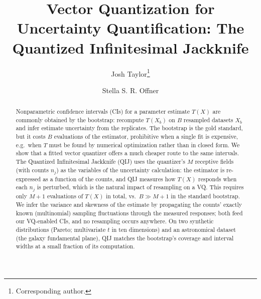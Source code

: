 \documentclass[runningheads]{llncs}
\begin{document}
\title{Vector Quantization for Uncertainty Quantification: The Quantized Infinitesimal Jackknife}

\author{Josh Taylor\thanks{Corresponding author.} \and
Stella S. R. Offner}

\maketitle

\begin{abstract}
Nonparametric confidence intervals (CIs) for a parameter estimate $T(X)$ are commonly obtained by the bootstrap: recompute $T(X_b)$ on $B$ resampled datasets $X_b$ and infer estimate uncertainty from the replicates. The bootstrap is the gold standard, but it costs $B$ evaluations of the estimator, prohibitive when a single fit is expensive, e.g.\ when $T$ must be found by numerical optimization rather than in closed form. We show that a fitted vector quantizer offers a much cheaper route to the same intervals. The Quantized Infinitesimal Jackknife (QIJ) uses the quantizer's $M$ receptive fields (with counts $n_j$) as the variables of the uncertainty calculation: the estimator is re-expressed as a function of the counts, and QIJ measures how $T(X)$ responds when each $n_j$ is perturbed, which is the natural impact of resampling on a VQ. This requires only $M{+}1$ evaluations of $T(X)$ in total, vs.\ $B \gg M{+}1$ in the standard bootstrap. We infer the variance and skewness of the estimate by propagating the counts' exactly known (multinomial) sampling fluctuations through the measured responses; both feed our VQ-enabled CIs, and no resampling occurs anywhere. On two synthetic distributions (Pareto; multivariate $t$ in ten dimensions) and an astronomical dataset (the galaxy fundamental plane), QIJ matches the bootstrap's coverage and interval widths at a small fraction of its computation.
\end{abstract}


\end{document}
